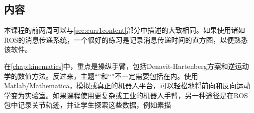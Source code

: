 

\subsection{内容}
本课程的前两周可以与\ref{sec:curr1content}部分中描述的大致相同。如果使用诸如ROS的消息传递系统，一个很好的练习是记录消息传递时间的直方图，以便熟悉该软件。

在\ref{chap:kinematics}中，重点是操纵手臂，包括Denavit-Hartenberg方案和逆运动学的数值方法。反过来，主题“”和“”不一定需要包括在内。使用Matlab/Mathematica，模拟或真正的机器人平台，可以轻松地将前向和反向运动学变为实验室。如果课程使用更复杂或工业的机器人手臂，另一种途径是在ROS包中记录关节轨迹，并让学生探索这些数据，例如素描


